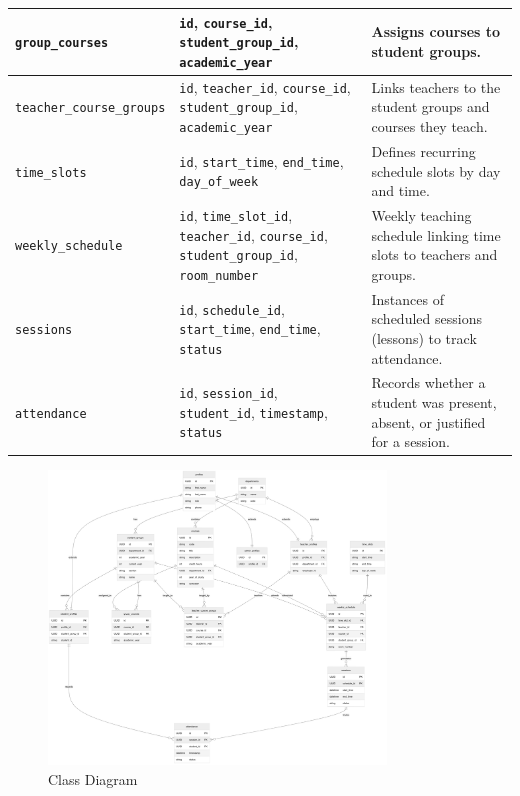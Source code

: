 \documentclass[12pt,a4paper]{report}
\begin{document}
\begin{table}[H]
\begin{tabular}{|p{3cm}|p{4cm}|p{7.5cm}|}
\hline
\texttt{group\_courses} & \texttt{id}, \texttt{course\_id}, \texttt{student\_group\_id}, \texttt{academic\_year} & Assigns courses to student groups. \\
\hline
\texttt{teacher\_course\_groups} & \texttt{id}, \texttt{teacher\_id}, \texttt{course\_id}, \texttt{student\_group\_id}, \texttt{academic\_year} & Links teachers to the student groups and courses they teach. \\
\hline
\texttt{time\_slots} & \texttt{id}, \texttt{start\_time}, \texttt{end\_time}, \texttt{day\_of\_week} & Defines recurring schedule slots by day and time. \\
\hline
\texttt{weekly\_schedule} & \texttt{id}, \texttt{time\_slot\_id}, \texttt{teacher\_id}, \texttt{course\_id}, \texttt{student\_group\_id}, \texttt{room\_number} & Weekly teaching schedule linking time slots to teachers and groups. \\
\hline
\texttt{sessions} & \texttt{id}, \texttt{schedule\_id}, \texttt{start\_time}, \texttt{end\_time}, \texttt{status} & Instances of scheduled sessions (lessons) to track attendance. \\
\hline
\texttt{attendance} & \texttt{id}, \texttt{session\_id}, \texttt{student\_id}, \texttt{timestamp}, \texttt{status} & Records whether a student was present, absent, or justified for a session. \\
\hline
\end{tabular}
\end{table}



\begin{figure}[htbp]
    \centering
    \includegraphics[width=0.8\textwidth]{images/morsli/class_diagram.png}
    \caption{Class Diagram}
    \label{fig:attendance-system}
\end{figure}
\end{document}

